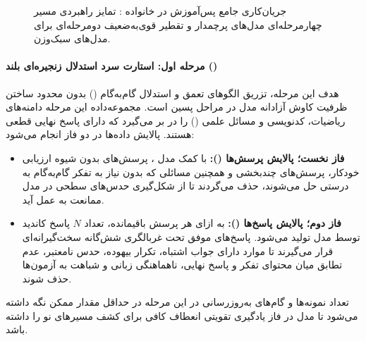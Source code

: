 \begin{figure}[htbp]
{%
}
\caption{جریان‌کاری جامع پس‌آموزش در خانواده : تمایز راهبردی مسیر چهارمرحله‌ای مدل‌های پرچمدار و تقطیر قوی‌به‌ضعیف دومرحله‌ای برای مدل‌های سبک‌وزن.}
\label{fig:qwen3_post_training_pipeline}
\end{figure}

\paragraph*{مرحله اول: استارت سرد استدلال زنجیره‌ای بلند ()}
هدف این مرحله، تزریق الگوهای تعمق و استدلال گام‌به‌گام () بدون محدود ساختن ظرفیت کاوش آزادانه مدل در مراحل پسین است. مجموعه‌داده این مرحله دامنه‌های ریاضیات، کدنویسی و مسائل علمی () را در بر می‌گیرد که دارای پاسخ نهایی قطعی هستند. پالایش داده‌ها در دو فاز انجام می‌شود:
\begin{itemize}
    \item \textbf{فاز نخست؛ پالایش پرسش‌ها ():} با کمک مدل  \cite{yang2024qwen25}، پرسش‌های بدون شیوه ارزیابی خودکار، پرسش‌های چندبخشی و همچنین مسائلی که بدون نیاز به تفکر گام‌به‌گام به درستی حل می‌شوند، حذف می‌گردند تا از شکل‌گیری حدس‌های سطحی در مدل ممانعت به عمل آید.
    \item \textbf{فاز دوم؛ پالایش پاسخ‌ها ():} به ازای هر پرسش باقیمانده، تعداد $N$ پاسخ کاندید توسط مدل  \cite{qwq32b} تولید می‌شود. پاسخ‌های موفق تحت غربالگری شش‌گانه سخت‌گیرانه‌ای قرار می‌گیرند تا موارد دارای جواب اشتباه، تکرار بیهوده، حدس نامعتبر، عدم تطابق میان محتوای تفکر و پاسخ نهایی، ناهماهنگی زبانی و شباهت به آزمون‌ها حذف شوند.
\end{itemize}
تعداد نمونه‌ها و گام‌های به‌روزرسانی در این مرحله در حداقل مقدار ممکن نگه داشته می‌شود تا مدل در فاز یادگیری تقویتی انعطاف کافی برای کشف مسیرهای نو را داشته باشد.

